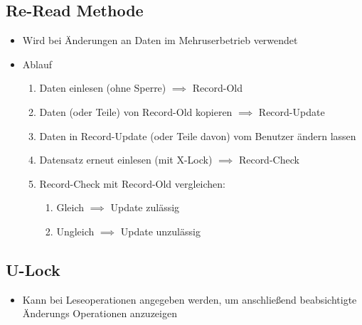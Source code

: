 \subsection{Re-Read Methode}
\begin{itemize}
    \item Wird bei Änderungen an Daten im Mehruserbetrieb verwendet
    \item Ablauf
    \begin{enumerate}
        \item Daten einlesen (ohne Sperre) $\implies$ Record-Old
        \item Daten (oder Teile) von Record-Old kopieren $\implies$ Record-Update
        \item Daten in Record-Update (oder Teile davon) vom Benutzer ändern lassen
        \item Datensatz erneut einlesen (mit X-Lock) $\implies$ Record-Check
        \item Record-Check mit Record-Old vergleichen:
        \begin{enumerate}
            \item Gleich $\implies$ Update zulässig
            \item Ungleich $\implies$ Update unzulässig
        \end{enumerate}
    \end{enumerate}
\end{itemize}

\subsection{U-Lock}
\begin{itemize}
    \item Kann bei Leseoperationen angegeben werden, um anschließend beabsichtigte Änderungs Operationen anzuzeigen
\end{itemize}

